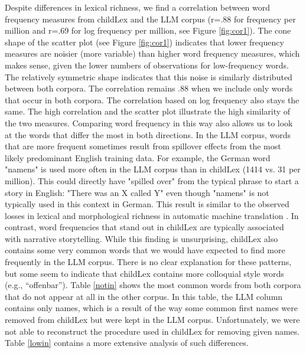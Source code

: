 \documentclass[manuscript]{stjour}
\begin{document}
Despite differences in lexical richness, we find a correlation between word frequency measures from childLex and the LLM corpus (r=.88 for frequency per million and r=.69 for log frequency per million, see Figure \ref{fig:cor1}). The cone shape of the scatter plot (see Figure \ref{fig:cor1}) indicates that lower frequency measures are noisier (more variable) than higher word frequency measures, which makes sense, given the lower numbers of observations for low-frequency words. The relatively symmetric shape indicates that this noise is similarly distributed between both corpora. The correlation remains .88 when we include only words that occur in both corpora. The correlation based on log frequency also stays the same. The high correlation and the scatter plot illustrate the high similarity of the two measures. Comparing word frequency in this way also allows us to look at the words that differ the most in both directions. In the LLM corpus, words that are more frequent sometimes result from spillover effects from the most likely predominant English training data. For example, the German word "namens" is used more often in the LLM corpus than in childLex (1414 vs. 31 per million). This could directly have "spilled over" from the typical phrase to start a story in English: "There was an X called Y" even though "namens" is not typically used in this context in German. This result is similar to the observed losses in lexical and morphological richness in automatic machine translation \citep{vanmassenhove_machine_2021}. In contrast, word frequencies that stand out in childLex are typically associated with narrative storytelling. While this finding is unsurprising, childLex also contains some very common words that we would have expected to find more frequently in the LLM corpus. There is no clear explanation for these patterns, but some seem to indicate that childLex contains more colloquial style words (e.g., “offenbar”). Table \ref{notin} shows the most common words from both corpora that do not appear at all in the other corpus. In this table, the LLM column contains only names, which is a result of the way some common first names were removed from childLex but were kept in the LLM corpus. Unfortunately, we were not able to reconstruct the procedure used in childLex for removing given names. Table \ref{lowin} contains a more extensive analysis of such differences. 
\end{document}
